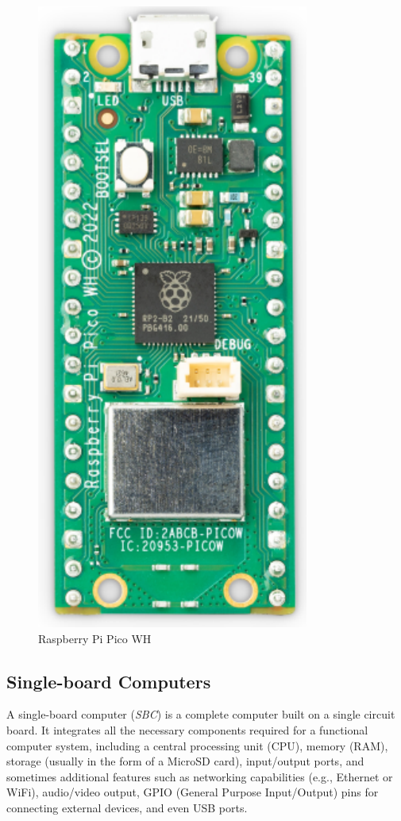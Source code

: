 \begin{figure}[h]
\begin{minipage}[b]{0.45\textwidth}
        \includegraphics[width=.6\textwidth]{Imagenes/Vectorial/piPicoWH.pdf}
        \caption{Raspberry Pi Pico WH}
        \label{fig:piPicoWH}
    \end{minipage}
\end{figure}


%
%
\subsection{Single-board Computers}

A single-board computer (\textit{SBC}) is a complete computer built on a single circuit board. It integrates all 
the necessary components required for a functional computer system, including a central processing unit (CPU), 
memory (RAM), storage (usually in the form of a MicroSD card), input/output ports, and sometimes additional 
features such as networking capabilities (e.g., Ethernet or WiFi), audio/video output, GPIO (General Purpose 
Input/Output) pins for connecting external devices, and even USB ports.


